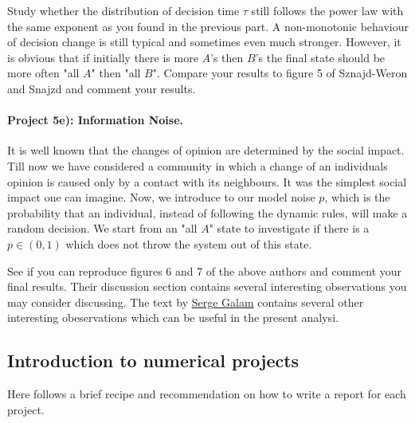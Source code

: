 \documentclass[%
oneside,                 %
final,                   %
10pt]{article}
\begin{document}
Study whether the distribution of decision time $\tau$ still follows
the power law with the same exponent as you found in the previous
part.  A non-monotonic behaviour of decision change is still typical
and sometimes even much stronger.  However, it is obvious that if
initially there is more $A$'s then $B$'s the final state should be
more often "all $A$" then "all $B$".  Compare your results to figure 5
of Sznajd-Weron and Snajzd and comment your results.

\paragraph{Project 5e): Information Noise.}
It is well known that the changes of opinion are determined by the
social impact. Till now we have considered a community in which a
change of an individuals opinion is caused only by a contact with its
neighbours. It was the simplest social impact one can imagine.  Now,
we introduce to our model noise $p$, which is the probability that an
individual, instead of following the dynamic rules, will make a random
decision. We start from an "all $A$" state to investigate if there is
a $p \in (0,1)$ which does not throw the system out of this state.

See if you can reproduce figures 6 and 7 of the above authors and
comment your final results. Their discussion section contains several interesting observations you may consider discussing. The text by \href{{https://www.springer.com/gp/book/9781461420316}}{Serge Galam} contains several other interesting obeservations which can be useful in the present analysi.

\subsection*{Introduction to numerical projects}

Here follows a brief recipe and recommendation on how to write a report for each
project.
\end{document}
